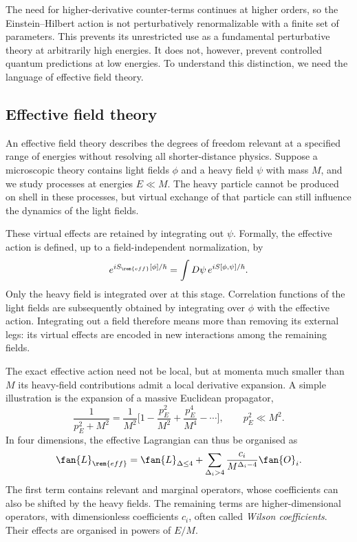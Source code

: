 The need for higher-derivative counter-terms continues at higher orders, so the Einstein--Hilbert action is not perturbatively renormalizable with a finite set of parameters. This prevents its unrestricted use as a fundamental perturbative theory at arbitrarily high energies. It does not, however, prevent controlled quantum predictions at low energies. To understand this distinction, we need the language of effective field theory.

\subsection{Effective field theory}
An effective field theory describes the degrees of freedom relevant at a specified range of energies without resolving all shorter-distance physics. Suppose a microscopic theory contains light fields $\phi$ and a heavy field $\psi$ with mass $M$, and we study processes at energies $E\ll M$. The heavy particle cannot be produced on shell in these processes, but virtual exchange of that particle can still influence the dynamics of the light fields.

These virtual effects are retained by integrating out $\psi$. Formally, the effective action is defined, up to a field-independent normalization, by
\begin{equation}
    e^{iS_{\rem{eff}}[\phi]/\hbar}
    =\int D\psi\,e^{iS[\phi,\psi]/\hbar}.
\end{equation}
Only the heavy field is integrated over at this stage. Correlation functions of the light fields are subsequently obtained by integrating over $\phi$ with the effective action. Integrating out a field therefore means more than removing its external legs: its virtual effects are encoded in new interactions among the remaining fields.

The exact effective action need not be local, but at momenta much smaller than $M$ its heavy-field contributions admit a local derivative expansion. A simple illustration is the expansion of a massive Euclidean propagator,
\begin{equation}
    \frac{1}{p_E^2+M^2}
    =\frac{1}{M^2}\bigg[1-\frac{p_E^2}{M^2}
    +\frac{p_E^4}{M^4}-\cdots\bigg],
    \qquad p_E^2\ll M^2.
\end{equation}
In four dimensions, the effective Lagrangian can thus be organised as
\begin{equation}
    \fan{L}_{\rem{eff}}
    =\fan{L}_{\Delta\leq4}
    +\sum_{\Delta_i>4}\frac{c_i}{M^{\Delta_i-4}}\fan{O}_i.
\end{equation}
The first term contains relevant and marginal operators, whose coefficients can also be shifted by the heavy fields. The remaining terms are higher-dimensional operators, with dimensionless coefficients $c_i$, often called \emph{Wilson coefficients}. Their effects are organised in powers of $E/M$.

